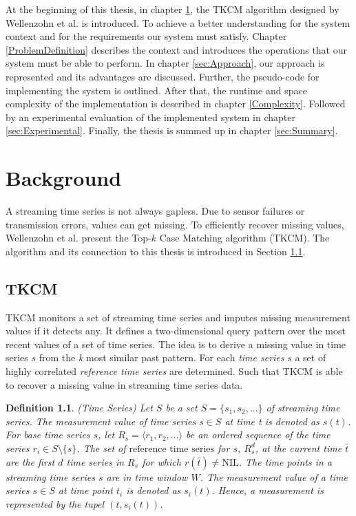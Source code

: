 \documentclass[abstracton,12pt,oneside]{scrreprt}
\begin{document}
At the beginning of this thesis, in chapter \ref{background}, the TKCM algorithm designed by Wellenzohn et al.\cite{BScT} is introduced. To achieve a better understanding for the system context and for the requirements our system must satisfy. Chapter \ref{ProblemDefinition} describes the context and introduces the operations that our system must be able to perform. In chapter \ref{sec:Approach}, our approach is represented and its advantages are discussed. Further, the pseudo-code for implementing the system is outlined. After that, the runtime and space complexity of the implementation is described in chapter \ref{Complexity}. Followed by an experimental evaluation of the implemented system in chapter \ref{sec:Experimental}. Finally, the thesis is summed up in chapter \ref{sec:Summary}.


\newtheorem{defn}{Definition}[section]
\newtheorem{exmp}{Example}[section]
\newcommand*{\argmin}{\operatornamewithlimits{argmin}\limits}

\chapter{Background}
\label{background}
A streaming time series is not always gapless. Due to sensor failures or transmission errors, values can get missing. To efficiently recover missing values, Wellenzohn et al.\cite{BScT} present the Top-$k$ Case Matching algorithm (TKCM). The algorithm and its connection to this thesis is introduced in Section \ref{TKCM}.

\section{TKCM}
\label{TKCM}
TKCM monitors a set of streaming time series and imputes missing measurement values if it detects any. It defines a two-dimensional query pattern over the most recent values of a set of time series. The idea is to derive a missing value in time series $s$ from the \emph{k} most similar past pattern. For each \emph{time series} $s$ a set of highly correlated \emph{reference time series} are determined. Such that TKCM is able to recover a missing value in streaming time series data.

\begin{defn}
	(Time Series) Let $S$ be a set $S = \{s_1,s_2,...\}$ of streaming time series. The measurement value of time series $s \in S$ at time \emph{t} is denoted as $s(t)$. For base time series $s$, let $R_s = \langle r_1, r_2,...\rangle$ be an ordered sequence of the time series $r_i \in S \setminus \{s\}$. The set of $\text{reference time series}$ for $s$, $R_s^d$, at the current time $\bar{t}$ are the first $d$ time series in $R_s$ for which $r(\bar{t}) \neq \text{NIL}$.
	The time points in a streaming time series $s$ are in time window $W$. 
	The measurement value of a time series $s \in S$ at time point $t_i$ is denoted as $s_i(t)$. Hence, a measurement is represented by the tupel $(t, s_i(t))$.
\end{defn}
\end{document}
